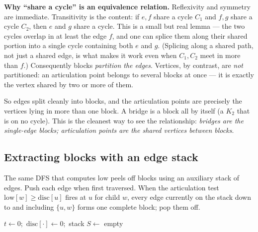 \begin{whybox}
\textbf{Why ``share a cycle'' is an equivalence relation.} Reflexivity and symmetry are
immediate. Transitivity is the content: if $e,f$ share a cycle $C_1$ and $f,g$ share a
cycle $C_2$, then $e$ and $g$ share a cycle. This is a small but real lemma --- the two
cycles overlap in at least the edge $f$, and one can splice them along their shared
portion into a single cycle containing both $e$ and $g$. (Splicing along a shared path,
not just a shared edge, is what makes it work even when $C_1,C_2$ meet in more than
$f$.) Consequently blocks \emph{partition the edges}. Vertices, by contrast, are
\emph{not} partitioned: an articulation point belongs to several blocks at once --- it
is exactly the vertex shared by two or more of them.
\end{whybox}

So edges split cleanly into blocks, and the articulation points are precisely the
vertices lying in more than one block. A bridge is a block all by itself (a $K_2$ that
is on no cycle). This is the cleanest way to see the relationship: \emph{bridges are the
single-edge blocks; articulation points are the shared vertices between blocks}.

\subsection{Extracting blocks with an edge stack}
\label{ch10:bccstack}

The same DFS that computes $\mathrm{low}$ peels off blocks using an auxiliary stack of
edges. Push each edge when first traversed. When the articulation test
$\mathrm{low}[w]\ge\mathrm{disc}[u]$ fires at $u$ for child $w$, every edge currently on
the stack down to and including $\{u,w\}$ forms one complete block; pop them off.

\begin{algorithm}[H]
\caption{\textsc{BiconnectedComponents}: peel blocks with an edge stack}
\label{ch10:alg-bcc}
$t\gets0$;\ $\mathrm{disc}[\cdot]\gets0$;\ stack $S\gets$ empty\;
\end{algorithm}

